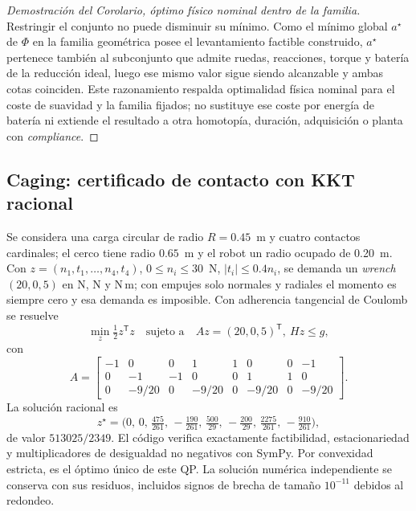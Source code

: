 \begin{proof}[Demostración del Corolario, óptimo físico nominal dentro de la familia]
Restringir el conjunto no puede disminuir su mínimo. Como el mínimo global
$a^\star$ de $\Phi$ en la familia geométrica posee el levantamiento factible
construido, $a^\star$ pertenece también al subconjunto que admite ruedas,
reacciones, torque y batería de la reducción ideal, luego ese mismo valor
sigue siendo alcanzable y ambas cotas coinciden. Este razonamiento respalda
optimalidad física nominal para el coste de suavidad y la familia fijados; no
sustituye ese coste por energía de batería ni extiende el resultado a otra
homotopía, duración, adquisición o planta con \emph{compliance}.
\end{proof}

\subsection{Caging: certificado de contacto con KKT racional}
\label{app:megajuego-caging-proof}

Se considera una carga circular de radio $R=0.45$~m y cuatro contactos
cardinales; el cerco tiene radio $0.65$~m y el robot un radio ocupado de
0.20~m. Con $z=(n_1,t_1,\ldots,n_4,t_4)$, $0\leq n_i\leq30$~N,
$|t_i|\leq0.4n_i$, se demanda un \emph{wrench} $(20,0,5)$ en N, N y N\,m; con
empujes solo normales y radiales el momento es siempre cero y esa demanda es
imposible. Con adherencia tangencial de Coulomb se resuelve
\[
 \min_z\tfrac12z^{\mathsf T}z \quad\text{sujeto a}\quad Az=(20,0,5)^{\mathsf T},\ Hz\leq g,
\]
con
\[
 A=\begin{bmatrix}-1&0&0&1&1&0&0&-1\\0&-1&-1&0&0&1&1&0\\0&-9/20&0&-9/20&0&-9/20&0&-9/20\end{bmatrix}.
\]
La solución racional es
\[
 z^\star=\Big(0,\,0,\,\tfrac{475}{261},\,-\tfrac{190}{261},\,\tfrac{500}{29},\,-\tfrac{200}{29},\,\tfrac{2275}{261},\,-\tfrac{910}{261}\Big),
\]
de valor $513025/2349$. El código verifica exactamente factibilidad,
estacionariedad y multiplicadores de desigualdad no negativos con SymPy. Por
convexidad estricta, es el óptimo único de este QP. La solución numérica
independiente se conserva con sus residuos, incluidos signos de brecha de
tamaño $10^{-11}$ debidos al redondeo.

